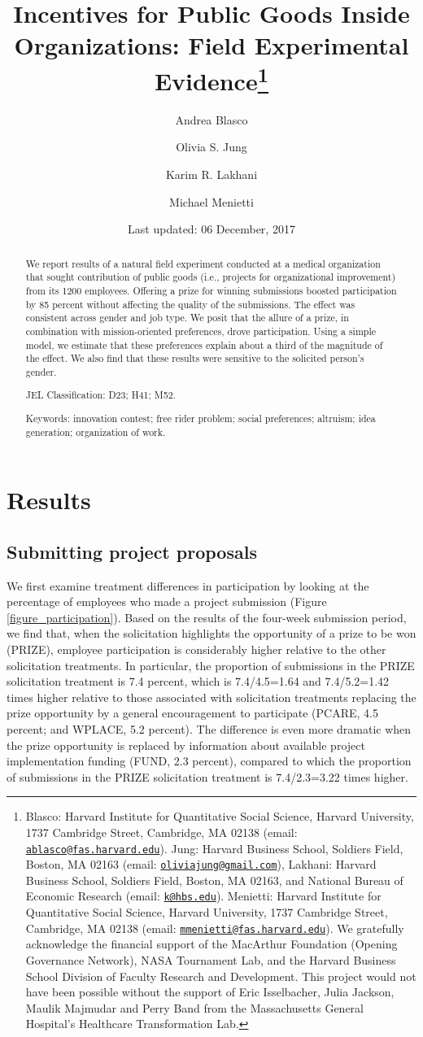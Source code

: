\documentclass[12pt, titlepage]{article}
\title{Incentives for Public Goods Inside Organizations: Field Experimental
Evidence\thanks{Blasco: Harvard Institute for Quantitative Social Science, Harvard
University, 1737 Cambridge Street, Cambridge, MA 02138 (email:
\href{mailto:ablasco@fas.harvard.edu}{\nolinkurl{ablasco@fas.harvard.edu}}).
Jung: Harvard Business School, Soldiers Field, Boston, MA 02163 (email:
\href{mailto:oliviajung@gmail.com}{\nolinkurl{oliviajung@gmail.com}}),
Lakhani: Harvard Business School, Soldiers Field, Boston, MA 02163, and
National Bureau of Economic Research (email:
\href{mailto:k@hbs.edu}{\nolinkurl{k@hbs.edu}}). Menietti: Harvard
Institute for Quantitative Social Science, Harvard University, 1737
Cambridge Street, Cambridge, MA 02138 (email:
\href{mailto:mmenietti@fas.harvard.edu}{\nolinkurl{mmenietti@fas.harvard.edu}}).
We gratefully acknowledge the financial support of the MacArthur
Foundation (Opening Governance Network), NASA Tournament Lab, and the
Harvard Business School Division of Faculty Research and Development.
This project would not have been possible without the support of Eric
Isselbacher, Julia Jackson, Maulik Majmudar and Perry Band from the
Massachusetts General Hospital's Healthcare Transformation Lab.}}
\author{Andrea Blasco \and Olivia S. Jung \and Karim R. Lakhani \and Michael Menietti}
\date{Last updated: 06 December, 2017}
\begin{document}
\maketitle
\begin{abstract}
We report results of a natural field experiment conducted at a medical
organization that sought contribution of public goods (i.e., projects
for organizational improvement) from its 1200 employees. Offering a
prize for winning submissions boosted participation by 85 percent
without affecting the quality of the submissions. The effect was
consistent across gender and job type. We posit that the allure of a
prize, in combination with mission-oriented preferences, drove
participation. Using a simple model, we estimate that these preferences
explain about a third of the magnitude of the effect. We also find that
these results were sensitive to the solicited person's gender.

\smallskip\noindent 
JEL Classification: D23; H41; M52.

\smallskip\noindent 
Keywords: innovation contest; free rider problem; social preferences; altruism; idea generation; organization of work.
\end{abstract}


\clearpage
\tableofcontents
\setcounter{tocdepth}{2}
\clearpage

\clearpage

\section{Results}\label{results}

\subsection{Submitting project
proposals}\label{submitting-project-proposals}

We first examine treatment differences in participation by looking at
the percentage of employees who made a project submission (Figure
\ref{figure_participation}). Based on the results of the four-week
submission period, we find that, when the solicitation highlights the
opportunity of a prize to be won (PRIZE), employee participation is
considerably higher relative to the other solicitation treatments. In
particular, the proportion of submissions in the PRIZE solicitation
treatment is 7.4 percent, which is 7.4/4.5=1.64 and 7.4/5.2=1.42 times
higher relative to those associated with solicitation treatments
replacing the prize opportunity by a general encouragement to
participate (PCARE, 4.5 percent; and WPLACE, 5.2 percent). The
difference is even more dramatic when the prize opportunity is replaced
by information about available project implementation funding (FUND, 2.3
percent), compared to which the proportion of submissions in the PRIZE
solicitation treatment is 7.4/2.3=3.22 times higher.
\end{document}
